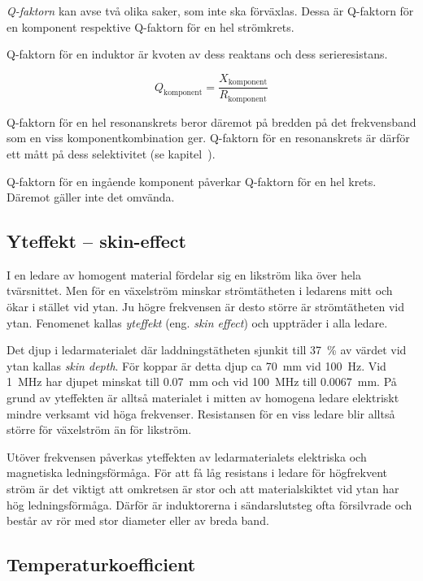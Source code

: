 \emph{Q-faktorn} kan avse två olika saker, som inte ska förväxlas.
Dessa är Q-faktorn för en komponent respektive Q-faktorn för en hel strömkrets.

Q-faktorn för en induktor är kvoten av dess reaktans och dess serieresistans.

\[Q_{\text{komponent}} = \dfrac{X_{\text{komponent}}}{R_{\text{komponent}}}\]

Q-faktorn för en hel resonanskrets beror däremot på bredden på det
frekvensband som en viss komponentkombination ger.
Q-faktorn för en resonanskrets är därför ett mått på dess
selektivitet (se kapitel~).

Q-faktorn för en ingående komponent påverkar Q-faktorn för en hel krets.
Däremot gäller inte det omvända.

\subsection{Yteffekt -- skin-effect}

I en ledare av homogent material fördelar sig en likström lika över hela
tvärsnittet.
Men för en växelström minskar strömtätheten i ledarens mitt och ökar i stället
vid ytan.
Ju högre frekvensen är desto större är strömtätheten vid ytan.
Fenomenet kallas \emph{yteffekt} (eng. \emph{skin effect}) och uppträder i alla
ledare.

Det djup i ledarmaterialet där laddningstätheten sjunkit till \qty{37}{\percent}
av värdet vid ytan kallas \emph{skin depth}.
För koppar är detta djup ca \qty{70}{\milli\metre} vid \qty{100}{\hertz}.
Vid \qty{1}{\mega\hertz} har djupet minskat till \qty{0,07}{\milli\metre} och
vid \qty{100}{\mega\hertz} till \qty{0,0067}{\milli\metre}.
På grund av yteffekten är alltså materialet i mitten av homogena ledare
elektriskt mindre verksamt vid höga frekvenser.
Resistansen för en viss ledare blir alltså större
för växelström än för likström.

Utöver frekvensen påverkas yteffekten av ledarmaterialets elektriska och
magnetiska ledningsförmåga.
För att få låg resistans i ledare för högfrekvent ström är det viktigt att
omkretsen är stor och att materialskiktet vid ytan har hög ledningsförmåga.
Därför är induktorerna i sändarslutsteg ofta försilvrade och består av rör med
stor diameter eller av breda band.

\subsection{Temperaturkoefficient}

